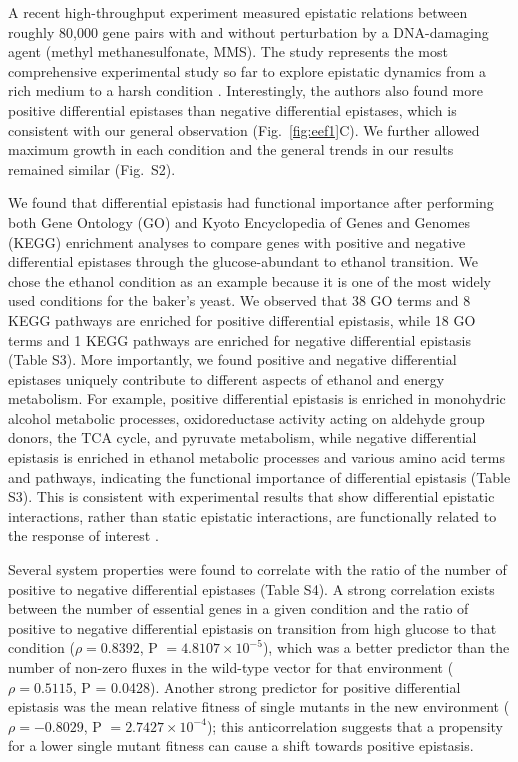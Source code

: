 \documentclass[10pt]{article}
\newcommand{\Fig}{Fig.}
\newcommand{\citep}{\cite}
\begin{document}
A recent high-throughput experiment measured epistatic relations
between roughly 80,000 gene pairs with and without perturbation by a
DNA-damaging agent (methyl methanesulfonate, MMS). The study
represents the most comprehensive experimental study so far to explore
epistatic dynamics from a rich medium to a harsh condition
\citep{Bandyopadhyay2011}. Interestingly, the authors also found more
positive differential
epistases than negative differential epistases, which is consistent
with our general observation (\Fig~\ref{fig:eef1}C). We further allowed maximum
growth in each condition and the general trends in our results
remained similar (\Fig~S2).

We found that differential epistasis had functional importance after
performing both Gene Ontology (GO) and Kyoto Encyclopedia of Genes and
Genomes (KEGG) enrichment analyses to compare genes with positive and
negative differential epistases through the glucose-abundant to
ethanol transition. We chose the ethanol condition as an example
because it is one of the most widely used conditions for the baker's
yeast. We observed that 38 GO terms and 8 KEGG pathways
are enriched for positive differential epistasis, while 18 GO terms
and 1 KEGG pathways are enriched for negative differential epistasis
(Table S3). More importantly, we found positive and negative
differential epistases uniquely contribute to different aspects of
ethanol and energy metabolism. For example, positive differential
epistasis is enriched in monohydric alcohol metabolic processes,
oxidoreductase activity acting on aldehyde group donors, the TCA
cycle, and pyruvate metabolism, while negative differential epistasis
is enriched in ethanol metabolic processes and various amino acid
terms and pathways, indicating the functional importance of
differential epistasis (Table S3). This is consistent with
experimental results that show differential epistatic interactions,
rather than static epistatic interactions, are functionally related to
the response of interest \citep{Bandyopadhyay2011}.

Several system properties were found to correlate with the ratio of
the number of positive to negative differential epistases (Table
S4). A strong correlation exists between the number of essential genes
in a given condition and the ratio of positive to negative
differential epistasis on transition from high glucose to that
condition ($\rho = 0.8392$, P $=4.8107 \times 10^{-5}$), which was a better predictor
than the number of non-zero fluxes in the wild-type vector for that
environment ($\rho = 0.5115$, P = 0.0428). Another strong predictor for
positive differential epistasis was the mean relative fitness of
single mutants in the new environment ($\rho = -0.8029$, P $= 2.7427 \times 10^{-4}$);
this anticorrelation suggests that a propensity for a lower single
mutant fitness can cause a shift towards positive epistasis.
\end{document}
